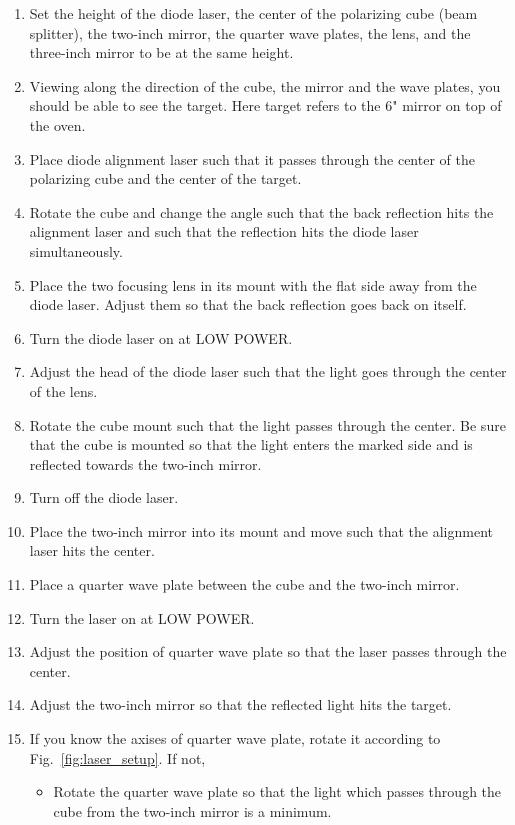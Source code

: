 {\begin{enumerate} \setlength{\parskip}{0ex}
\item Set the height of the diode laser, the center of the polarizing
  cube (beam splitter), the two-inch mirror, the quarter wave plates, 
  the lens, and the three-inch mirror to be at the same height.
\item Viewing along the direction of the cube, the mirror and the wave 
  plates, you should be able to see the target.  Here target refers to
  the 6" mirror on top of the oven.  
 \item Place diode alignment laser such that it passes through the center
  of the polarizing cube and the center of the target.
\item Rotate the cube and change the angle such that the back reflection
  hits the alignment laser and such that the reflection hits the diode
  laser simultaneously.
\item Place the two focusing lens in its mount with the flat side away
  from the diode laser. Adjust them so that the back reflection goes back 
  on itself.
\item Turn the diode laser on at LOW POWER.
\item Adjust the head of the diode laser such that the light goes
  through the center of the lens.
\item Rotate the cube mount such that the light passes through the
  center. Be sure that the cube is mounted so that the light enters 
  the marked side and is reflected towards the two-inch mirror.
\item Turn off the diode laser.
\item Place the two-inch mirror into its mount and move such that the
  alignment laser hits the center.
\item Place a quarter wave plate between the cube and the two-inch
  mirror.
\item Turn the laser on at LOW POWER.
\item Adjust the position of quarter wave plate so that the laser passes through the
  center.
\item Adjust the two-inch mirror so that the reflected light hits 
  the target.
\item If you know the axises of quarter wave plate, rotate it according to 
      Fig.~\ref{fig:laser_setup}.  If not, 
\begin{itemize}
\item Rotate the quarter wave plate so that the light which passes
  through the cube from the two-inch mirror is a minimum.

\end{itemize}
\end{enumerate}}
